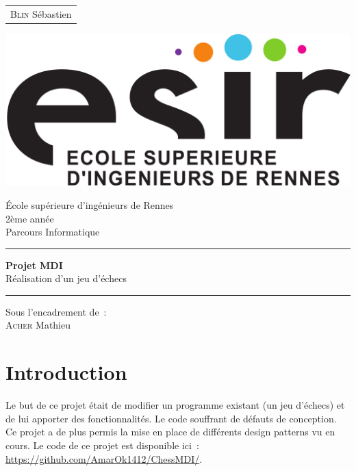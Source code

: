\documentclass{article}
\begin{document}
	\begin{titlepage}
		\vspace{-20px}
		\begin{tabular}{l}
			\textsc{Blin} Sébastien
		\end{tabular}
		\hfill \vspace{10px}\includegraphics[scale=0.1]{esir}\\
		\vfill
		\begin{center}
			\Huge{\'Ecole sup\'erieure d'ing\'enieurs de Rennes}\\
			\vspace{1cm}
			\LARGE{2ème année}\\
			\large{Parcours Informatique}\\
			\vspace{0.5cm}\hrule\vspace{0.5cm}
			\LARGE{\textbf{Projet MDI}}\\
			\Large{Réalisation d'un jeu d'échecs}
			\vspace{0.5cm}\hrule
			\vfill
			\vfill
		\end{center}
		\begin{flushleft}
			\Large{Sous l'encadrement de~:}\\
			\vspace{0.2cm}
			\large{\textsc{Acher} Mathieu}
		\end{flushleft}
		\vfill
	\end{titlepage}

	\section{Introduction}
	Le but de ce projet était de modifier un programme existant (un jeu d'échecs) et de lui apporter des fonctionnalités. Le code souffrant de défauts de conception. Ce projet a de plus permis la mise en place de différents design patterns vu en cours. Le code de ce projet est disponible ici~: \url{https://github.com/AmarOk1412/ChessMDI/}.
\end{document}
